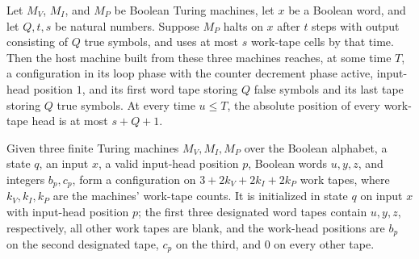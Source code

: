 \begin{theorem}
\label{Complexity.b2b_setup_run}
\leanok
{}
Let $M_V$, $M_I$, and $M_P$ be Boolean Turing machines, let $x$ be a Boolean word, and
let $Q,t,s$ be natural numbers. Suppose $M_P$ halts on $x$ after $t$ steps with output
consisting of $Q$ true symbols, and uses at most $s$ work-tape cells by that time. Then
the host machine built from these three machines reaches, at some time $T$, a
configuration in its loop phase with the counter decrement phase active, input-head
position $1$, and its first word tape storing $Q$ false symbols and its last tape
storing $Q$ true symbols. At every time $u\le T$, the absolute position of every
work-tape head is at most $s+Q+1$.
\end{theorem}

\begin{definition}
\label{Complexity.b2b_trialCfg}
\leanok
{}
Given three finite Turing machines $M_V,M_I,M_P$ over the Boolean alphabet, a state $q$,
an input $x$, a valid input-head position $p$, Boolean words $u,y,z$, and integers
$b_p,c_p$, form a configuration on $3+2k_V+2k_I+2k_P$ work tapes, where $k_V,k_I,k_P$
are the machines’ work-tape counts. It is initialized in state $q$ on input $x$ with
input-head position $p$; the first three designated word tapes contain $u,y,z$,
respectively, all other work tapes are blank, and the work-head positions are $b_p$ on
the second designated tape, $c_p$ on the third, and $0$ on every other tape.
\end{definition}

